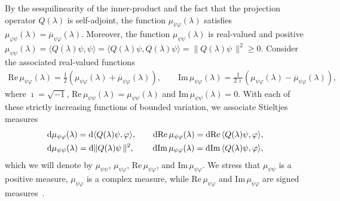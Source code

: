 \documentclass[leqno,onefignum,onetabnum]{siamltex1213}
\renewcommand{\d}{\mathrm{d}}
\newcommand\Real{\mbox{Re}\,} %
\newcommand\Imag{\mbox{Im}\,} %
\begin{document}
By the sesquilinearity of the inner-product and the fact that the
projection operator $Q(\lambda)$ is self-adjoint, the function $\mu_{\psi\varphi}(\lambda)$
satisfies $\mu_{\varphi\psi}(\lambda)=\overline{\mu}_{\psi\varphi}(\lambda)$. Moreover, the function
$\mu_{\psi\psi}(\lambda)$ is real-valued and positive
$\mu_{\psi\psi}(\lambda)=\langle Q(\lambda)\psi,\psi\rangle=\langle Q(\lambda)\psi,Q(\lambda)\psi\rangle=\|Q(\lambda)\psi\,\|^2\geq0$. 
Consider the associated real-valued functions   
%
\begin{align}\label{eq:Fns_Bounded_Var}
  \Real\mu_{\psi\varphi}(\lambda)
         =\frac{1}{2}\left(\mu_{\psi\varphi}(\lambda)+\overline{\mu}_{\psi\varphi}(\lambda)\right),
  \qquad
  \Imag\mu_{\psi\varphi}(\lambda)
         =\frac{1}{2\,\imath}\left(\mu_{\psi\varphi}(\lambda)-\overline{\mu}_{\psi\varphi}(\lambda)\right),
\end{align}
%
where $\imath=\sqrt{-1}$, $\Real\mu_{\psi\psi}(\lambda)=\mu_{\psi\psi}(\lambda)$ and
$\Imag\mu_{\psi\psi}(\lambda)=0$. With each of these strictly increasing functions
of bounded variation, we associate Stieltjes
measures~\cite{Stieltjes:1995,Stone:64,Folland:99:RealAnalysis}  
%
\begin{align}\label{eq:Bounded_Variation}
  &\d\mu_{\psi\varphi}(\lambda)=\d\langle Q(\lambda)\psi,\varphi\rangle, \qquad
  \d\Real\mu_{\psi\varphi}(\lambda)=\d\Real\langle Q(\lambda)\psi,\varphi\rangle,\\  
  &\d\mu_{\psi\psi}(\lambda)=\d\|Q(\lambda)\psi\,\|^2, \qquad
  \hspace{0.2em}
  \d\Imag\mu_{\psi\varphi}(\lambda)=\d\Imag\langle Q(\lambda)\psi,\varphi\rangle,
  \notag
\end{align}
%
which we will denote by $\mu_{\psi\psi}$, $\mu_{\psi\varphi}$, $\Real\mu_{\psi\varphi}$, and
$\Imag\mu_{\psi\varphi}$. We stress that $\mu_{\psi\psi}$ is a positive measure, $\mu_{\psi\varphi}$
is a complex measure, while $\Real\mu_{\psi\varphi}$ and $\Imag\mu_{\psi\varphi}$ are signed
measures~\cite{Stieltjes:1995,Stone:64}.  
\end{document}

